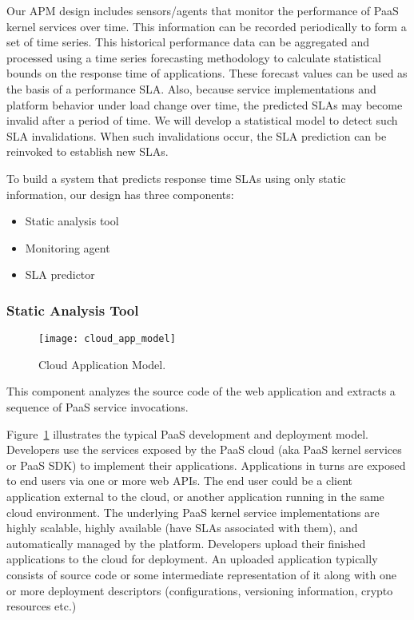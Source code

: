 Our APM design includes sensors/agents that monitor the performance of PaaS kernel services over time. This
information can be recorded periodically to form a set of time series. This historical performance data can be
aggregated and processed using a time series forecasting methodology to calculate statistical bounds on the
response time of applications. These forecast values can be used as the basis of
a performance SLA.
Also, because service implementations and platform behavior under load change over time,
the predicted SLAs may become invalid after a period of time. We will develop a statistical model to detect such SLA invalidations.
When such invalidations occur, the SLA prediction can be reinvoked to establish new SLAs.

To build a system that predicts response time SLAs using only static information, our design has three components:
\begin{itemize}
\item Static analysis tool
\item Monitoring agent
\item SLA predictor
\end{itemize}

\subsubsection{Static Analysis Tool}
\begin{figure}
\centering
\texttt{[image: cloud\_app\_model]}
\caption{Cloud Application Model.}
\label{fig:cloud_app_model}
\end{figure}

This component analyzes the source code of the web application and extracts a sequence of PaaS service invocations.

Figure~\ref{fig:cloud_app_model} illustrates the typical PaaS development and deployment model. 
Developers use the services exposed by the
PaaS cloud (aka PaaS kernel services or PaaS SDK) to implement their applications. Applications
in turns are exposed to end users via one or more web APIs. The end user could be a client application
external to the cloud, or another application running in the same cloud environment. 
The underlying PaaS kernel service implementations are highly scalable, highly available
(have SLAs associated with them), and automatically managed by the platform. 
Developers upload their finished applications to the cloud for deployment. An uploaded
application typically consists of source code or some intermediate representation of it along
with one or more deployment descriptors (configurations, versioning information, crypto resources etc.)

